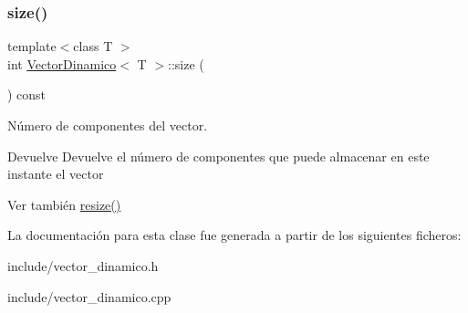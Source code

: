 \subsubsection{\texorpdfstring{size()}{size()}}
{\footnotesize\ttfamily template$<$class T $>$ \\
int \hyperlink{classVectorDinamico}{Vector\+Dinamico}$<$ T $>$\+::size (\begin{DoxyParamCaption}{ }\end{DoxyParamCaption}) const}



Número de componentes del vector. 

\begin{DoxyReturn}{Devuelve}
Devuelve el número de componentes que puede almacenar en este instante el vector 
\end{DoxyReturn}
\begin{DoxySeeAlso}{Ver también}
\hyperlink{classVectorDinamico_a9b3fd8907bc3ca9b5bc5775bbb11f867}{resize()} 
\end{DoxySeeAlso}


La documentación para esta clase fue generada a partir de los siguientes ficheros\+:\begin{DoxyCompactItemize}
\item 
include/vector\+\_\+dinamico.\+h\item 
include/vector\+\_\+dinamico.\+cpp\end{DoxyCompactItemize}
